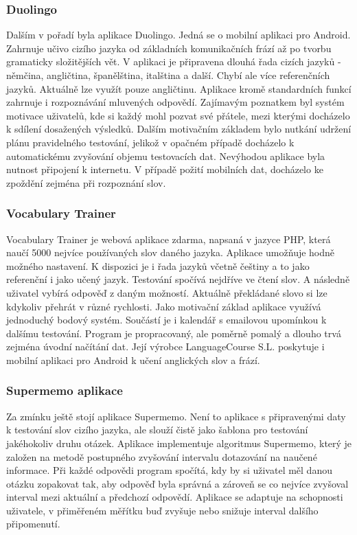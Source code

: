 \documentclass[a4paper,11pt,titlepage,fleqn]{article}
\begin{document}
        \subsubsection{Duolingo}
            Dalším v pořadí byla aplikace Duolingo. Jedná se o mobilní aplikaci pro Android. Zahrnuje učivo cizího jazyka od základních komunikačních frází až po tvorbu gramaticky složitějších vět. V aplikaci je připravena dlouhá řada cizích jazyků - němčina, angličtina, španělština, italština a další. Chybí ale více referenčních jazyků. Aktuálně lze využít pouze angličtinu. Aplikace kromě standardních funkcí zahrnuje i rozpoznávání mluvených odpovědí. Zajímavým poznatkem byl systém motivace uživatelů, kde si každý mohl pozvat své přátele, mezi kterými docházelo k sdílení dosažených výsledků. Dalším motivačním základem bylo nutkání udržení plánu pravidelného testování, jelikož v opačném případě docházelo k automatickému zvyšování objemu testovacích dat. Nevýhodou aplikace byla nutnost připojení k internetu. V případě požití mobilních dat, docházelo ke zpoždění zejména při rozpoznání slov.

        \subsubsection{Vocabulary Trainer}
            Vocabulary Trainer je webová aplikace zdarma, napsaná v jazyce PHP, která naučí 5000 nejvíce používaných slov daného jazyka. Aplikace umožňuje hodně možného nastavení. K dispozici je i řada jazyků včetně češtiny a to jako referenční i jako učený jazyk. Testování spočívá nejdříve ve čtení slov. A následně uživatel vybírá odpověď z daným možností. Aktuálně překládané slovo si lze kdykoliv přehrát v různé rychlosti. Jako motivační základ aplikace využívá jednoduchý bodový systém. Součástí je i kalendář s emailovou upomínkou k dalšímu testování. Program je propracovaný, ale poměrně pomalý a dlouho trvá zejména úvodní načítání dat. Její výrobce LanguageCourse S.L. poskytuje i mobilní aplikaci pro Android k učení anglických slov a frází.

        \subsubsection{Supermemo aplikace}
            \label{supermemo-app}
            Za zmínku ještě stojí aplikace Supermemo. Není to aplikace s připravenými daty k testování slov cizího jazyka, ale slouží čistě jako šablona pro testování jakéhokoliv druhu otázek. Aplikace implementuje algoritmus Supermemo, který je založen na metodě postupného zvyšování intervalu dotazování na naučené informace. Při každé odpovědi program spočítá, kdy by si uživatel měl danou otázku zopakovat tak, aby odpověď byla správná a zároveň se co nejvíce zvyšoval interval mezi aktuální a předchozí odpovědí. Aplikace se adaptuje na schopnosti uživatele, v přiměřeném měřítku buď zvyšuje nebo snižuje interval dalšího připomenutí.
\end{document}
